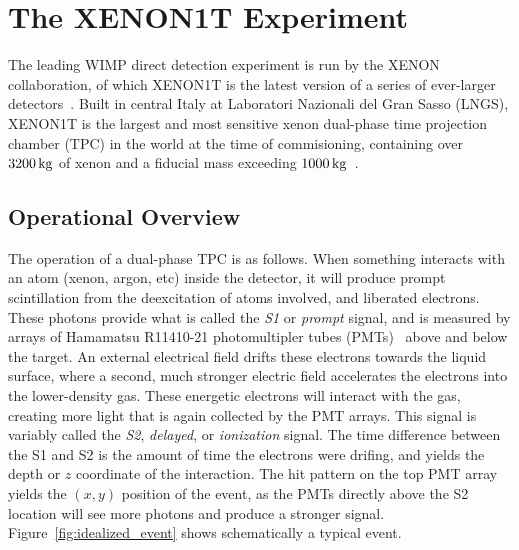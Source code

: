 
\chapter{The XENON1T Experiment}

The leading WIMP direct detection experiment is run by the XENON collaboration, of which XENON1T is the latest version of a series of ever-larger detectors~\cite{Angle:2007uj,Aprile:2011dd}. Built in central Italy at Laboratori Nazionali del Gran Sasso (LNGS), XENON1T is the largest and most sensitive xenon dual-phase time projection chamber (TPC) in the world at the time of commisioning, containing over $3200\, \mathrm{kg}$ of xenon and a fiducial mass exceeding $1000\, \mathrm{kg}$~\cite{Aprile:2017iyp}.

\section{Operational Overview}

The operation of a dual-phase TPC is as follows. When something interacts with an atom (xenon, argon, etc) inside the detector, it will produce prompt scintillation from the deexcitation of atoms involved, and liberated electrons. These photons provide what is called the \textit{S1} or \textit{prompt} signal, and is measured by arrays of Hamamatsu R11410-21 photomultipler tubes (PMTs)~\cite{Aprile:2015lha} above and below the target. An external electrical field drifts these electrons towards the liquid surface, where a second, much stronger electric field accelerates the electrons into the lower-density gas. These energetic electrons will interact with the gas, creating more light that is again collected by the PMT arrays. This signal is variably called the \textit{S2}, \textit{delayed}, or \textit{ionization} signal. The time difference between the S1 and S2 is the amount of time the electrons were drifing, and yields the depth or $z$ coordinate of the interaction. The hit pattern on the top PMT array yields the $(x,y)$ position of the event, as the PMTs directly above the S2 location will see more photons and produce a stronger signal. Figure~\ref{fig:idealized_event} shows schematically a typical event.

